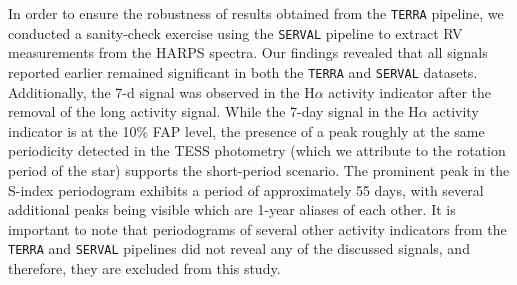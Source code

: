 \documentclass[traditabstract,longauth]{aa}
\begin{document}
In order to ensure the robustness of results obtained from the {\tt TERRA} pipeline, we conducted a sanity-check exercise using the {\tt SERVAL} pipeline \citep{Zechmeister2018} to extract RV measurements from the HARPS spectra. Our findings revealed that all signals reported earlier remained significant in both the {\tt TERRA} and {\tt SERVAL} datasets. %
Additionally, the 7-d signal was observed in the H$\alpha$ activity indicator after the removal of the long activity signal. While the 7-day signal in the H$\alpha$ activity indicator is at the 10\% FAP level, the presence of a peak roughly at the same periodicity detected in the TESS photometry (which we attribute to the rotation period of the star) supports the short-period scenario. The prominent peak in the S-index periodogram exhibits a period of approximately 55 days, with several additional peaks being visible which are 1-year aliases of each other. It is important to note that periodograms of several other activity indicators from the {\tt TERRA} and {\tt SERVAL} pipelines did not reveal any of the discussed signals, and therefore, they are excluded from this study.
\end{document}
